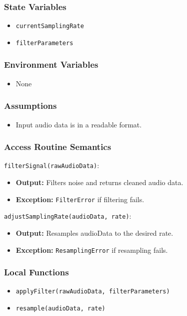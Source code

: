 \documentclass[12pt, titlepage]{article}
\begin{document}
\subsubsection{State Variables}  
\begin{itemize}  
    \item \texttt{currentSamplingRate}  
    \item \texttt{filterParameters}  
\end{itemize}  

\subsubsection{Environment Variables}  
\begin{itemize}  
    \item None  
\end{itemize}  

\subsubsection{Assumptions}  
\begin{itemize}  
    \item Input audio data is in a readable format.  
\end{itemize}  

\subsubsection{Access Routine Semantics}  

\noindent \texttt{filterSignal(rawAudioData)}:
\begin{itemize}  
    \item \textbf{Output:} Filters noise and returns cleaned audio data.  
    \item \textbf{Exception:} \texttt{FilterError} if filtering fails.  
\end{itemize}  

\noindent \texttt{adjustSamplingRate(audioData, rate)}:
\begin{itemize}  
    \item \textbf{Output:} Resamples audioData to the desired rate.  
    \item \textbf{Exception:} \texttt{ResamplingError} if resampling fails.  
\end{itemize}  

\subsubsection{Local Functions}  
\begin{itemize}  
    \item \texttt{applyFilter(rawAudioData, filterParameters)}  
    \item \texttt{resample(audioData, rate)}  
\end{itemize}  
\end{document}
